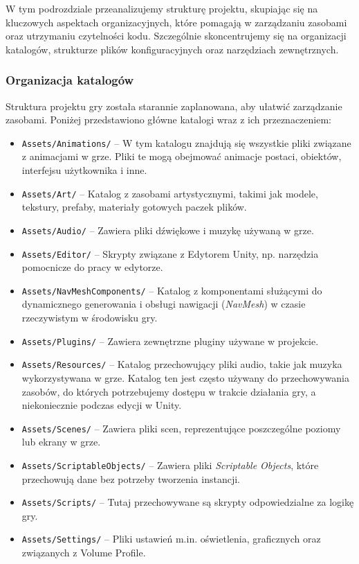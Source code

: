 W tym podrozdziale przeanalizujemy strukturę projektu, skupiając się na kluczowych aspektach organizacyjnych, które pomagają w zarządzaniu zasobami oraz utrzymaniu czytelności kodu. Szczególnie skoncentrujemy się na organizacji katalogów, strukturze plików konfiguracyjnych oraz narzędziach zewnętrznych.

\subsubsection{Organizacja katalogów}
Struktura projektu gry została starannie zaplanowana, aby ułatwić zarządzanie zasobami. Poniżej przedstawiono główne katalogi wraz z ich przeznaczeniem:
\begin{itemize}
    \item \texttt{Assets/Animations/} -- W tym katalogu znajdują się wszystkie pliki związane z animacjami w grze. Pliki te mogą obejmować animacje postaci, obiektów, interfejsu użytkownika i inne.
    \item \texttt{Assets/Art/} -- Katalog z zasobami artystycznymi, takimi jak modele, tekstury, prefaby, materiały gotowych paczek plików.
    \item \texttt{Assets/Audio/} -- Zawiera pliki dźwiękowe i muzykę używaną w grze.
    \item \texttt{Assets/Editor/} -- Skrypty związane z Edytorem Unity, np. narzędzia pomocnicze do pracy w edytorze.
    \item \texttt{Assets/NavMeshComponents/} -- Katalog z komponentami służącymi do dynamicznego generowania i obsługi nawigacji (\textit{NavMesh}) w czasie rzeczywistym w środowisku gry.
    \item \texttt{Assets/Plugins/} -- Zawiera zewnętrzne pluginy używane w projekcie.
    \item \texttt{Assets/Resources/} -- Katalog przechowujący pliki audio, takie jak muzyka wykorzystywana w grze. Katalog ten jest często używany do przechowywania zasobów, do których potrzebujemy dostępu w trakcie działania gry, a niekoniecznie podczas edycji w Unity.
    \item \texttt{Assets/Scenes/} -- Zawiera pliki scen, reprezentujące poszczególne poziomy lub ekrany w grze.
    \item \texttt{Assets/ScriptableObjects/} -- Zawiera pliki \textit{Scriptable Objects}, które przechowują dane bez potrzeby tworzenia instancji.
    \item \texttt{Assets/Scripts/} -- Tutaj przechowywane są skrypty odpowiedzialne za logikę gry.
    \item \texttt{Assets/Settings/} -- Pliki ustawień m.in. oświetlenia, graficznych oraz związanych z Volume Profile.

\end{itemize}

